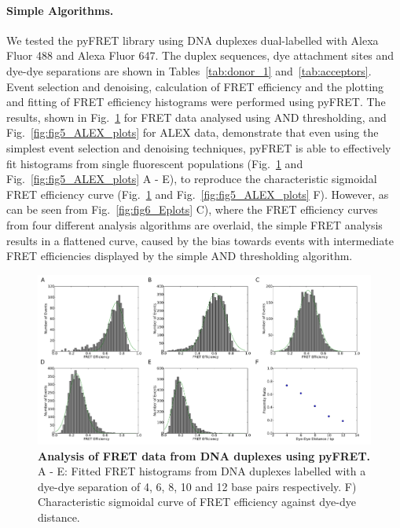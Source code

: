 \paragraph{Simple Algorithms.}
We tested the pyFRET library using DNA duplexes dual-labelled with Alexa Fluor 488 and Alexa Fluor 647. The duplex sequences, dye attachment sites and dye-dye separations are shown in Tables~\ref{tab:donor_1} and~\ref{tab:acceptors}. Event selection and denoising, calculation of FRET efficiency and the plotting and fitting of FRET efficiency histograms were performed using pyFRET. The results, shown in Fig.~\ref{fig:fig4_AND_plots} for FRET data analysed using AND thresholding, and Fig.~\ref{fig:fig5_ALEX_plots} for ALEX data, demonstrate that even using the simplest event selection and denoising techniques, pyFRET is able to effectively fit histograms from single fluorescent populations (Fig.~\ref{fig:fig4_AND_plots} and Fig.~\ref{fig:fig5_ALEX_plots} A - E), to reproduce the characteristic sigmoidal FRET efficiency curve (Fig.~\ref{fig:fig4_AND_plots} and Fig.~\ref{fig:fig5_ALEX_plots} F). However, as can be seen from Fig.~\ref{fig:fig6_Eplots} C), where the FRET efficiency curves from four different analysis algorithms are overlaid, the simple FRET analysis results in a flattened curve, caused by the bias towards events with intermediate FRET efficiencies displayed by the simple AND thresholding algorithm. 

\begin{figure}[!ht]
   \begin{center}
      \includegraphics*[clip=true, width=6in]{pyFRET/FRET_AND.pdf}
      \caption{{\bf Analysis of FRET data from DNA duplexes using pyFRET.} A - E: Fitted FRET histograms from DNA duplexes labelled with a dye-dye separation of 4, 6, 8, 10 and 12 base pairs respectively. F) Characteristic sigmoidal curve of FRET efficiency against dye-dye distance.}
      \label{fig:fig4_AND_plots}
   \end{center}
\end{figure}

